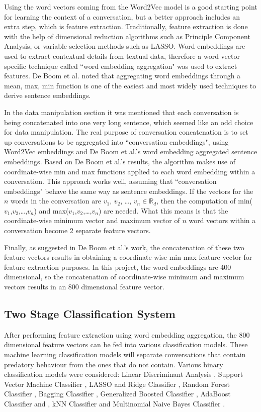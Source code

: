 \documentclass[11pt]{article}
\newcommand{\R}{\mathbb{R}}
\begin{document}
Using the word vectors coming from the Word2Vec model is a good starting point for learning the context of a conversation, but a better approach includes an extra step, which is feature extraction. Traditionally, feature extraction is done with the help of dimensional reduction algorithms such as Principle Component Analysis, or variable selection methods such as LASSO. Word embeddings are used to extract contextual details from textual data, therefore a word vector specific technique called ``word embedding aggregation" \cite{de2016representation} was used to extract features. De Boom et al. noted that aggregating word embeddings through a mean, max, min function is one of the easiest and most widely used techniques to derive sentence embeddings. 

In the data manipulation section it was mentioned that each conversation is being concatenated into one very long sentence, which seemed like an odd choice for data manipulation. The real purpose of conversation concatenation is to set up conversations to be aggregated into ``conversation embeddings", using Word2Vec embeddings and De Boom et al.'s word embedding aggregated sentence embeddings. 
Based on De Boom et al.'s results, the algorithm makes use of coordinate-wise min and max functions applied to each word embedding within a conversation. This approach works well, assuming that ``conversation embeddings" behave the same way as sentence embeddings. If the vectors for the $n$ words in the conversation are $v_1$, $v_2$, \dots, $v_n \in \R_{d}$, then the computation of min($v_1$,$v_2$,\dots,$v_n$) and max($v_1$,$v_2$,\dots,$v_n$) are needed. What this means is that the coordinate-wise minimum vector and maximum vector of $n$ word vectors within a conversation become 2 separate feature vectors. 

Finally, as suggested in De Boom et al.'s work, the concatenation of these two feature vectors results in obtaining a coordinate-wise min-max feature vector for feature extraction purposes. In this project, the word embeddings are 400 dimensional, so the concatenation of coordinate-wise minimum and maximum vectors results in an 800 dimensional feature vector.

\subsection{Two Stage Classification System}
After performing feature extraction using word embedding aggregation, the 800 dimensional feature vectors can be fed into various classification models. These machine learning classification models will separate conversations that contain predatory behaviour from the ones that do not contain. Various binary classification models were considered: Linear Discriminant Analysis \cite{ripley2007pattern}, Support Vector Machine Classifier \cite{fan2008liblinear}, LASSO and Ridge Classifier \cite{friedman2010regularization}, Random Forest Classifier \cite{breiman2001random}, Bagging Classifier \cite{breiman1996bagging}, Generalized Boosted Classifier \cite{ridgeway2006gbm}, AdaBoost Classifier \cite{freund1996experiments} and \cite{hastie2009multi}, kNN Classifier \cite{ripley2007pattern} and Multinomial Naive Bayes Classifier \cite{mccallum1998comparison}. 
\end{document}
